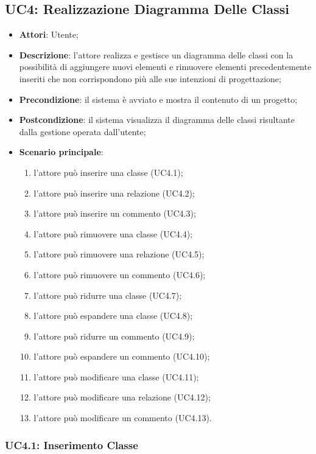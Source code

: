 \subsection{UC4: Realizzazione Diagramma Delle Classi}
\label{UC4}

\begin{itemize}
\item \textbf{Attori}: Utente;
\item \textbf{Descrizione}: l'attore realizza e gestisce un diagramma delle classi con la possibilità di aggiungere nuovi elementi e rimuovere elementi precedentemente inseriti che non corrispondono più alle sue intenzioni di progettazione;
\item \textbf{Precondizione}: il sistema è avviato e mostra il contenuto di un progetto;
\item \textbf{Postcondizione}: il sistema visualizza il diagramma delle classi risultante dalla gestione operata dall'utente;
\item \textbf{Scenario principale}:
	\begin{enumerate}
	 \item l'attore può inserire una classe (UC4.1);
	 \item l'attore può inserire una relazione (UC4.2);
	 \item l'attore può inserire un commento (UC4.3);
	 \item l'attore può rimuovere una classe (UC4.4);
	 \item l'attore può rimuovere una relazione (UC4.5);
	 \item l'attore può rimuovere un commento (UC4.6);
	 \item l'attore può ridurre una classe (UC4.7);
	 \item l'attore può espandere una classe (UC4.8);
	 \item l'attore può ridurre un commento (UC4.9);
	 \item l'attore può espandere un commento (UC4.10);
	  \item l'attore può modificare una classe (UC4.11);
	 \item l'attore può modificare una relazione (UC4.12);
	 \item l'attore può modificare un commento (UC4.13).
	\end{enumerate}
\end{itemize}

\subsubsection{UC4.1: Inserimento Classe}
\label{UC4.1}

